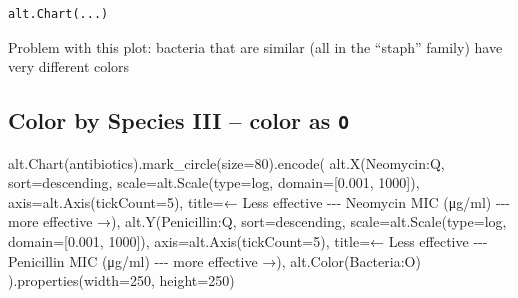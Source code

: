 \documentclass[
  letterpaper,
  DIV=11,
  numbers=noendperiod]{scrartcl}
\newenvironment{Shaded}{\begin{snugshade}}{\end{snugshade}}
\newcommand{\BuiltInTok}[1]{\textcolor[rgb]{0.00,0.23,0.31}{#1}}
\newcommand{\DecValTok}[1]{\textcolor[rgb]{0.68,0.00,0.00}{#1}}
\newcommand{\FloatTok}[1]{\textcolor[rgb]{0.68,0.00,0.00}{#1}}
\newcommand{\NormalTok}[1]{\textcolor[rgb]{0.00,0.23,0.31}{#1}}
\newcommand{\OperatorTok}[1]{\textcolor[rgb]{0.37,0.37,0.37}{#1}}
\newcommand{\StringTok}[1]{\textcolor[rgb]{0.13,0.47,0.30}{#1}}
\begin{document}
\begin{verbatim}
alt.Chart(...)
\end{verbatim}

Problem with this plot: bacteria that are similar (all in the ``staph''
family) have very different colors

\subsection{\texorpdfstring{Color by Species III -- color as
\texttt{O}}{Color by Species III -- color as O}}\label{color-by-species-iii-color-as-o}

\begin{Shaded}
\begin{Highlighting}[]
\NormalTok{alt.Chart(antibiotics).mark\_circle(size}\OperatorTok{=}\DecValTok{80}\NormalTok{).encode(}
\NormalTok{    alt.X(}\StringTok{\textquotesingle{}Neomycin:Q\textquotesingle{}}\NormalTok{,}
\NormalTok{          sort}\OperatorTok{=}\StringTok{\textquotesingle{}descending\textquotesingle{}}\NormalTok{,}
\NormalTok{          scale}\OperatorTok{=}\NormalTok{alt.Scale(}\BuiltInTok{type}\OperatorTok{=}\StringTok{\textquotesingle{}log\textquotesingle{}}\NormalTok{, domain}\OperatorTok{=}\NormalTok{[}\FloatTok{0.001}\NormalTok{, }\DecValTok{1000}\NormalTok{]),}
\NormalTok{          axis}\OperatorTok{=}\NormalTok{alt.Axis(tickCount}\OperatorTok{=}\DecValTok{5}\NormalTok{),}
\NormalTok{          title}\OperatorTok{=}\StringTok{\textquotesingle{}← Less effective {-}{-}{-} Neomycin MIC (μg/ml) {-}{-}{-} more effective →\textquotesingle{}}\NormalTok{),}
\NormalTok{    alt.Y(}\StringTok{\textquotesingle{}Penicillin:Q\textquotesingle{}}\NormalTok{,}
\NormalTok{          sort}\OperatorTok{=}\StringTok{\textquotesingle{}descending\textquotesingle{}}\NormalTok{,}
\NormalTok{          scale}\OperatorTok{=}\NormalTok{alt.Scale(}\BuiltInTok{type}\OperatorTok{=}\StringTok{\textquotesingle{}log\textquotesingle{}}\NormalTok{, domain}\OperatorTok{=}\NormalTok{[}\FloatTok{0.001}\NormalTok{, }\DecValTok{1000}\NormalTok{]),}
\NormalTok{          axis}\OperatorTok{=}\NormalTok{alt.Axis(tickCount}\OperatorTok{=}\DecValTok{5}\NormalTok{),}
\NormalTok{          title}\OperatorTok{=}\StringTok{\textquotesingle{}← Less effective {-}{-}{-} Penicillin MIC (μg/ml) {-}{-}{-} more effective →\textquotesingle{}}\NormalTok{),}
\NormalTok{    alt.Color(}\StringTok{\textquotesingle{}Bacteria:O\textquotesingle{}}\NormalTok{)}
\NormalTok{).properties(width}\OperatorTok{=}\DecValTok{250}\NormalTok{, height}\OperatorTok{=}\DecValTok{250}\NormalTok{)}
\end{Highlighting}
\end{Shaded}
\end{document}
